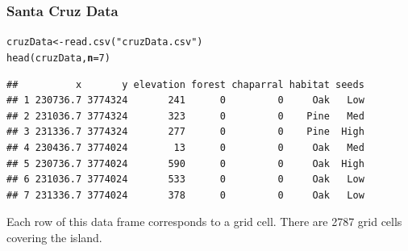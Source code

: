 \documentclass[color=usenames,dvipsnames]{beamer}\usepackage[]{graphicx}\usepackage[]{color}
\makeatletter
\newcommand{\hlnum}[1]{\textcolor[rgb]{0.69,0.494,0}{#1}}%
\newcommand{\hlstr}[1]{\textcolor[rgb]{0.749,0.012,0.012}{#1}}%
\newcommand{\hlstd}[1]{\textcolor[rgb]{0,0,0}{#1}}%
\newcommand{\hlkwb}[1]{\textcolor[rgb]{0,0.341,0.682}{#1}}%
\newcommand{\hlkwc}[1]{\textcolor[rgb]{0,0,0}{\textbf{#1}}}%
\newcommand{\hlkwd}[1]{\textcolor[rgb]{0.004,0.004,0.506}{#1}}%
\newenvironment{kframe}{%
 \def\at@end@of@kframe{}%
 \ifinner\ifhmode%
  \def\at@end@of@kframe{\end{minipage}}%
  \begin{minipage}{\columnwidth}%
 \fi\fi%
 \def\FrameCommand##1{\hskip\@totalleftmargin \hskip-\fboxsep
 \colorbox{shadecolor}{##1}\hskip-\fboxsep
     \hskip-\linewidth \hskip-\@totalleftmargin \hskip\columnwidth}%
 \MakeFramed {\advance\hsize-\width
   \@totalleftmargin\z@ \linewidth\hsize
   \@setminipage}}%
 {\par\unskip\endMakeFramed%
 \at@end@of@kframe}
\newenvironment{knitrout}{}{} %
\makeatother
\begin{document}
\begin{frame}[fragile]
  \frametitle{Santa Cruz Data}
  \footnotesize
\begin{knitrout}
\color{fgcolor}\begin{kframe}
\begin{alltt}
\hlstd{cruzData} \hlkwb{<-} \hlkwd{read.csv}\hlstd{(}\hlstr{"cruzData.csv"}\hlstd{)}
\hlkwd{head}\hlstd{(cruzData,} \hlkwc{n}\hlstd{=}\hlnum{7}\hlstd{)}
\end{alltt}
\begin{verbatim}
##          x       y elevation forest chaparral habitat seeds
## 1 230736.7 3774324       241      0         0     Oak   Low
## 2 231036.7 3774324       323      0         0    Pine   Med
## 3 231336.7 3774324       277      0         0    Pine  High
## 4 230436.7 3774024        13      0         0     Oak   Med
## 5 230736.7 3774024       590      0         0     Oak  High
## 6 231036.7 3774024       533      0         0     Oak   Low
## 7 231336.7 3774024       378      0         0     Oak   Low
\end{verbatim}
\end{kframe}
\end{knitrout}
  {Each row of this data frame corresponds to a grid cell. There are 2787 grid cells covering the island. \\} 
\end{frame}
\end{document}
